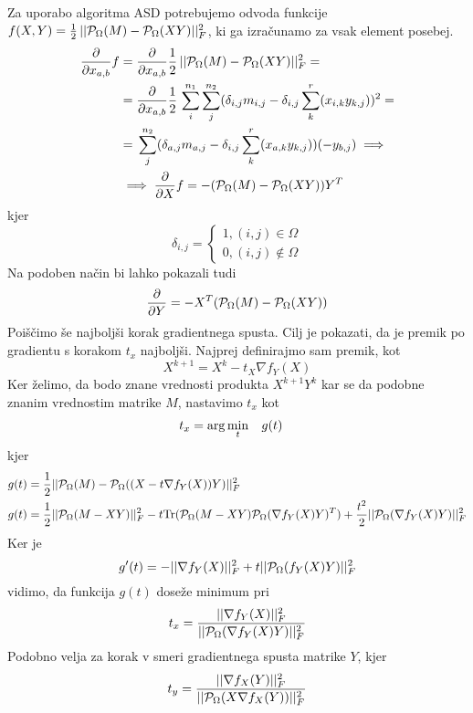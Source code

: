 Za uporabo algoritma ASD potrebujemo odvoda funkcije $f(X,Y) = \frac{1}{2}\, ||\mathcal{P}_\Omega(M) - \mathcal{P}_\Omega(XY)||^2_F$, ki ga izračunamo za vsak element posebej.
\begin{align*}
    \frac{\partial}{\partial x_{a,b}} f &= \frac{\partial}{\partial x_{a,b}} \frac{1}{2}\, ||\mathcal{P}_\Omega(M) - \mathcal{P}_\Omega(XY)||^2_F = \\
    &= \frac{\partial}{\partial x_{a,b}} \frac{1}{2}\, \sum_{i}^{n_1}\sum_{j}^{n_2}(\delta_{i,j}m_{i,j} - \delta_{i,j}\sum_{k}^{r}(x_{i,k}y_{k,j}))^2 = \\
    &= \, \sum_{j}^{n_2}(\delta_{a,j}m_{a,j} - \delta_{i,j}\sum_{k}^{r}(x_{a,k}y_{k,j}))(-y_{b,j}) \implies \\
    &\implies \frac{\partial}{\partial X}f = -(\mathcal{P}_\Omega(M) - \mathcal{P}_\Omega(XY))Y^T
\end{align*}
kjer 
\[
    \delta_{i,j} = \begin{cases}
        1, (i, j) \in \Omega \\
        0, (i, j) \notin \Omega
    \end{cases}
\]
Na podoben način bi lahko pokazali tudi
\[
    \frac{\partial}{\partial Y} = -X^T (\mathcal{P}_\Omega(M) - \mathcal{P}_\Omega(XY))
\]
Poiščimo še najboljši korak gradientnega spusta.
Cilj je pokazati, da je premik po gradientu s korakom $t_x$ najboljši.
Najprej definirajmo sam premik, kot
\[
    X^{k+1} = X^k - t_X \nabla f_Y(X)
\]
Ker želimo, da bodo znane vrednosti produkta $X^{k+1}Y^{k}$ kar se da podobne znanim vrednostim matrike $M$, nastavimo $t_x$ kot 
\begin{align*}
    t_x &= \arg \min_t \hspace{0.3cm} g(t)
\end{align*} kjer
\begin{align*}
    g(t) &= \frac{1}{2} ||\mathcal{P}_\Omega(M) - \mathcal{P}_\Omega((X - t\nabla f_Y(X))Y)||_F^2 \\
    g(t) &= \frac{1}{2} ||\mathcal{P}_\Omega(M - XY)||_F^2 - t\text{Tr}(\mathcal{P}_\Omega(M - XY)\mathcal{P}_\Omega(\nabla f_Y(X)Y)^T) + \frac{t^2}{2}||\mathcal{P}_\Omega(\nabla f_Y(X)Y)||_F^2
\end{align*}
Ker je \cite{AST-TK15} 
\[
  g'(t) = -||\nabla f_Y(X)||_F^2 + t||\mathcal{P}_\Omega(f_Y(X)Y)||_F^2 
\]
vidimo, da funkcija $g(t)$ doseže minimum pri 
\[
  t_x = \frac{||\nabla f_Y(X)||_F^2}{||\mathcal{P}_\Omega(\nabla f_Y(X)Y)||_F^2}  
\]
Podobno velja za korak v smeri gradientnega spusta matrike $Y$, kjer
\[
  t_y = \frac{||\nabla f_X(Y)||_F^2}{||\mathcal{P}_\Omega(X \nabla f_X(Y))||_F^2}  
\]
